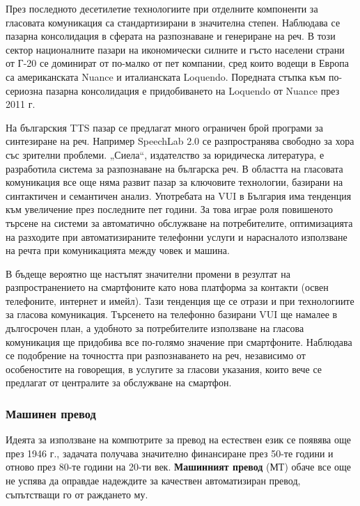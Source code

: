 \documentclass[]{../../metanetpaper}
\begin{document}
\begin{multicols}{2}
През последното десетилетие технологиите при отделните компоненти за гласовата комуникация са стандартизирани в значителна степен. Наблюдава се пазарна консолидация в сферата на разпознаване и генериране на реч. В този сектор националните пазари на икономически силните и гъсто населени страни от Г-20 се доминират от по-малко от пет компании, сред които водещи в Европа са американската Nuance и италианската Loquendo. Поредната стъпка към по-сериозна пазарна консолидация  е придобиването на Loquendo от Nuance през 2011 г.

На българския TTS пазар се предлагат много ограничен брой програми за синтезиране на реч. Например SpeechLab 2.0 се разпространява свободно за хора със зрителни проблеми. „Сиела“, издателство за юридическа литература, е разработила система за разпознаване на българска реч. В областта на  гласовата комуникация все още няма развит пазар за ключовите технологии, базирани на синтактичен и семантичен анализ.
Употребата на VUI в България има тенденция към увеличение през последните пет години. За това играе роля повишеното търсене на системи за автоматично
 обслужване на потребителите, оптимизацията на
 разходите при автоматизираните телефонни услуги и
 нарасналото използване на речта при комуникацията между човек и
машина.

В бъдеще вероятно ще настъпят значителни промени в
 резултат на разпространението на смартфоните като
 нова платформа за контакти (освен телефоните, интернет и имейл).
Тази тенденция ще се отрази и при технологиите за
 гласова комуникация. Търсенето на
 телефонно базирани VUI ще намалее в дългосрочен
 план, а удобното за потребителите използване на гласова комуникация ще придобива все по-голямо значение при смартфоните. Наблюдава се подобрение на
 точността при разпознаването на реч, независимо от особеностите на
 говорещия, в услугите за гласови указания, които вече се предлагат от централите за обслужване на смартфон.

\subsubsection{Машинен превод}

Идеята за използване на компютрите за превод
 на естествен език се появява още през 1946 г.,
 задачата получава значително финансиране през 50-те години и отново през 80-те години на 20-ти век. \textbf{Машинният превод} (МТ) обаче все още не успява да оправдае надеждите за качествен автоматизиран превод, съпътстващи го от раждането му.


\end{multicols}
\end{document}
